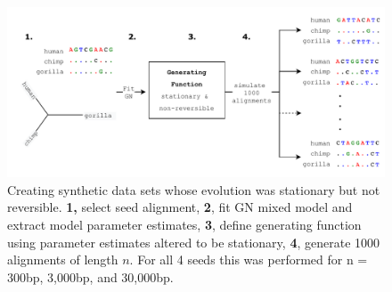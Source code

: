 \begin{figure}[htbp]
\centering
\includegraphics[width=\textwidth]{figures/diagrams/simulating_alns.pdf}
\caption{Creating synthetic data sets whose evolution was stationary but not reversible. \textbf{1,} select seed alignment, \textbf{2}, fit GN mixed model and extract model parameter estimates, \textbf{3}, define generating function using parameter estimates altered to be stationary, \textbf{4}, generate 1000 alignments of length $n$. For all 4 seeds this was performed for n = 300bp, 3,000bp, and 30,000bp.}
\label{fig:simulating_alns}
\end{figure}